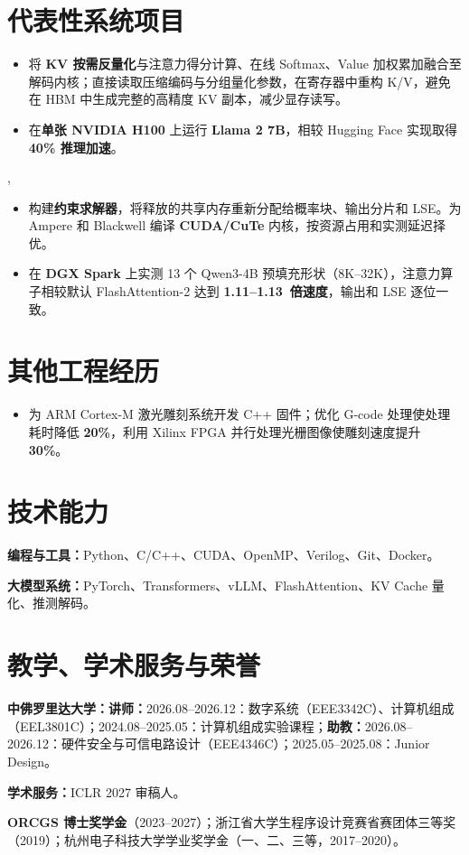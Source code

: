 \documentclass[a4paper,10pt]{article}
\begin{document}
\section{代表性系统项目}
\begin{itemize}
  \item 将 \textbf{KV 按需反量化}与注意力得分计算、在线 Softmax、Value 加权累加融合至解码内核；直接读取压缩编码与分组量化参数，在寄存器中重构 K/V，避免在 HBM 中生成完整的高精度 KV 副本，减少显存读写。
  \item 在\textbf{单张 NVIDIA H100} 上运行 \textbf{Llama 2 7B}，相较 Hugging Face 实现取得 \textbf{40\% 推理加速}。
\end{itemize}
\sep
{}
\begin{itemize}
  \item 构建\textbf{约束求解器}，将释放的共享内存重新分配给概率块、输出分片和 LSE。为 Ampere 和 Blackwell 编译 \textbf{CUDA/CuTe} 内核，按资源占用和实测延迟择优。
  \item 在 \textbf{DGX Spark} 上实测 13 个 Qwen3-4B 预填充形状（8K--32K），注意力算子相较默认 FlashAttention-2 达到 \mbox{\textbf{1.11--1.13 倍速度}}，输出和 LSE 逐位一致。
\end{itemize}

\section{其他工程经历}
\begin{itemize}
  \item 为 ARM Cortex-M 激光雕刻系统开发 C++ 固件；优化 G-code 处理使处理耗时降低 \textbf{20\%}，利用 Xilinx FPGA 并行处理光栅图像使雕刻速度提升 \textbf{30\%}。
\end{itemize}
\section{技术能力}
\textbf{编程与工具：}Python、C/C++、CUDA、OpenMP、Verilog、Git、Docker。\par
\textbf{大模型系统：}PyTorch、Transformers、vLLM、FlashAttention、KV Cache 量化、推测解码。\par

\section{教学、学术服务与荣誉}
\textbf{中佛罗里达大学：讲师：}2026.08--2026.12：数字系统（EEE3342C）、\mbox{计算机组成（EEL3801C）}；\mbox{2024.08--2025.05：计算机组成实验课程}；\textbf{助教：}2026.08--2026.12：硬件安全与可信电路设计（EEE4346C）；2025.05--2025.08：Junior Design。\par
\textbf{学术服务：}ICLR 2027 审稿人。\par
\textbf{ORCGS 博士奖学金}（2023--2027）；浙江省大学生程序设计竞赛省赛团体三等奖（2019）；杭州电子科技大学学业奖学金（一、二、三等，2017--2020）。
\end{document}
